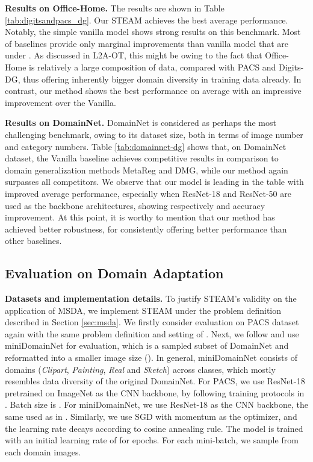 \documentclass[10pt,twocolumn,letterpaper]{article}
\newcommand{\0}{{\bf 0}}
\begin{document}
\textbf{Results on Office-Home.}
The results are shown in Table \ref{tab:digitsandpacs_dg}. Our STEAM achieves the best average performance. Notably, the simple vanilla model shows strong results on this benchmark. Most of baselines provide only marginal improvements than vanilla model that are under . As discussed in L2A-OT, this might be owing to the fact that Office-Home is relatively a large composition of data, compared with PACS and Digits-DG, thus offering inherently bigger domain diversity in training data already. In contrast, our method shows the best performance on average with an impressive  improvement over the Vanilla.

\textbf{Results on DomainNet.}
DomainNet is considered as perhaps the most challenging benchmark, owing to its dataset size, both in terms of image number and category numbers. Table \ref{tab:domainnet-dg} shows that, on DomainNet dataset, the Vanilla baseline achieves competitive results in comparison to domain generalization methods MetaReg and DMG, while our method again surpasses all competitors. We observe that our model is leading in the table with improved average performance, especially when ResNet-18 and ResNet-50 are used as the backbone architectures, showing respectively  and  accuracy improvement. At this point, it is worthy to mention that our method has achieved better robustness, for consistently offering better performance than other baselines.

\subsection{Evaluation on Domain Adaptation}
\textbf{Datasets and implementation details.} To justify STEAM's validity on the application of MSDA, we implement STEAM under the problem definition described in Section \ref{sec:msda}. We firstly consider evaluation on PACS dataset again with the same problem definition and setting of \cite{yang2020curriculum}. Next, we follow \cite{zhou2020domain} and use miniDomainNet for evaluation, which is a sampled subset of DomainNet and reformatted into a smaller image size (). In general, miniDomainNet consists of  domains (\textit{Clipart}, \textit{Painting}, \textit{Real} and \textit{Sketch}) across  classes, which mostly resembles data diversity of the original DomainNet. For PACS, we use ResNet-18 pretrained on ImageNet as the CNN backbone, by following training protocols in \cite{yang2020curriculum}. Batch size is . For miniDomainNet, we use ResNet-18 as the CNN backbone, the same used as in \cite{zhou2020domain}. Similarly, we use SGD with momentum as the optimizer, and the learning rate decays according to cosine annealing rule. The model is trained with an initial learning rate of  for  epochs. For each mini-batch, we sample from each domain  images.
\end{document}

